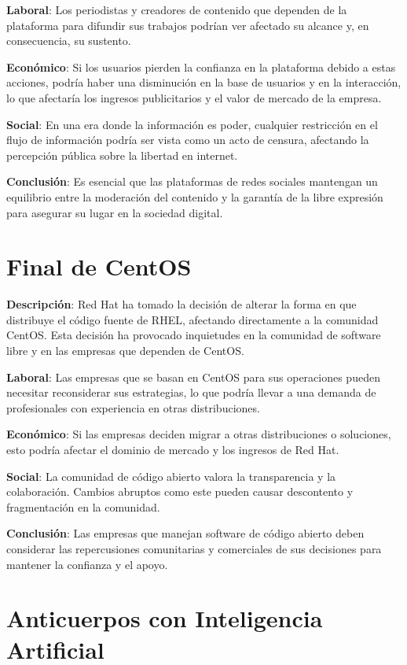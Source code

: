\documentclass{article}
\begin{document}
\textbf{Laboral}: Los periodistas y creadores de contenido que dependen de la plataforma para difundir sus trabajos podrían ver afectado su alcance y, en consecuencia, su sustento.

\textbf{Económico}: Si los usuarios pierden la confianza en la plataforma debido a estas acciones, podría haber una disminución en la base de usuarios y en la interacción, lo que afectaría los ingresos publicitarios y el valor de mercado de la empresa.

\textbf{Social}: En una era donde la información es poder, cualquier restricción en el flujo de información podría ser vista como un acto de censura, afectando la percepción pública sobre la libertad en internet.

\textbf{Conclusión}: Es esencial que las plataformas de redes sociales mantengan un equilibrio entre la moderación del contenido y la garantía de la libre expresión para asegurar su lugar en la sociedad digital.

\section*{Final de CentOS}

\textbf{Descripción}: Red Hat ha tomado la decisión de alterar la forma en que distribuye el código fuente de RHEL, afectando directamente a la comunidad CentOS. Esta decisión ha provocado inquietudes en la comunidad de software libre y en las empresas que dependen de CentOS.

\textbf{Laboral}: Las empresas que se basan en CentOS para sus operaciones pueden necesitar reconsiderar sus estrategias, lo que podría llevar a una demanda de profesionales con experiencia en otras distribuciones.

\textbf{Económico}: Si las empresas deciden migrar a otras distribuciones o soluciones, esto podría afectar el dominio de mercado y los ingresos de Red Hat.

\textbf{Social}: La comunidad de código abierto valora la transparencia y la colaboración. Cambios abruptos como este pueden causar descontento y fragmentación en la comunidad.

\textbf{Conclusión}: Las empresas que manejan software de código abierto deben considerar las repercusiones comunitarias y comerciales de sus decisiones para mantener la confianza y el apoyo.

\section*{Anticuerpos con Inteligencia Artificial}
\end{document}
